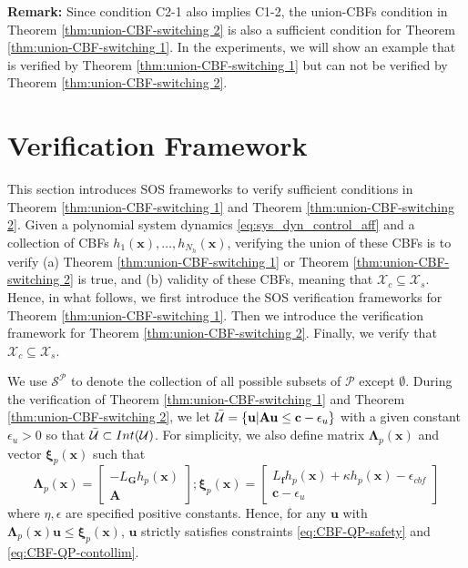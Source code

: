 \documentclass[letterpaper, 10 pt, conference]{ieeeconf}  %
\begin{document}
\textbf{Remark: } Since condition C2-1 also implies C1-2, the union-CBFs condition in Theorem \ref{thm:union-CBF-switching 2} is also a sufficient condition for Theorem \ref{thm:union-CBF-switching 1}. {In the experiments, we will show an example that is verified by Theorem \ref{thm:union-CBF-switching 1} but can not be verified by Theorem \ref{thm:union-CBF-switching 2}.}
\section{Verification Framework}
\label{sec:verification}
This section introduces SOS frameworks to verify sufficient conditions in Theorem \ref{thm:union-CBF-switching 1} and Theorem \ref{thm:union-CBF-switching 2}. Given a polynomial system dynamics \eqref{eq:sys_dyn_control_aff} and a collection of CBFs $h_1(\mathbf{x}),\dots,h_{N_h}(\mathbf{x})$, verifying the union of these CBFs is to verify (a) Theorem \ref{thm:union-CBF-switching 1} or Theorem \ref{thm:union-CBF-switching 2} is true, and (b) validity of these CBFs, meaning that $\mathcal{X}_c\subseteq\mathcal{X}_s$. Hence, in what follows, we first introduce the SOS verification frameworks for Theorem \ref{thm:union-CBF-switching 1}. Then we introduce the verification framework for Theorem \ref{thm:union-CBF-switching 2}. Finally, we verify that $\mathcal{X}_c\subseteq\mathcal{X}_s$.

We use $\mathcal{S}^{\mathcal{P}}$ to denote the collection of all possible subsets of $\mathcal{P}$ except $\emptyset$. During the verification of Theorem \ref{thm:union-CBF-switching 1} and Theorem \ref{thm:union-CBF-switching 2}, we let $\Bar{\mathcal{U}}=\{\mathbf{u}|\mathbf{A}\mathbf{u}\leq\mathbf{c}-\epsilon_{u}\}$ with a given constant $\epsilon_{u}>0$ so that $\Bar{\mathcal{U}}\subset Int(\mathcal{U})$. For simplicity, we also define matrix $\boldsymbol{\Lambda}_p(\mathbf{x})$ and vector $\boldsymbol{\xi}_p(\mathbf{x})$ such that
\begin{equation}
\label{eq:xi_lambda}
    \boldsymbol{\Lambda}_p(\mathbf{x}) = 
    \begin{bmatrix}
        -L_{\mathbf{G}}h_p(\mathbf{x})\\
        \mathbf{A}
    \end{bmatrix};
    \boldsymbol{\xi}_p(\mathbf{x}) = 
    \begin{bmatrix}
        L_{\mathbf{f}}h_p(\mathbf{x}) + \kappa h_p(\mathbf{x}) - \epsilon_{cbf}\\
        \mathbf{c} - \epsilon_{u}
    \end{bmatrix}
\end{equation}
where $\eta, \epsilon$ are specified positive constants. Hence, for any $\mathbf{u}$ with $\boldsymbol{\Lambda}_p(\mathbf{x})\mathbf{u}\leq\boldsymbol{\xi}_p(\mathbf{x})$, $\mathbf{u}$ strictly satisfies constraints \eqref{eq:CBF-QP-safety} and \eqref{eq:CBF-QP-contollim}.
\end{document}
